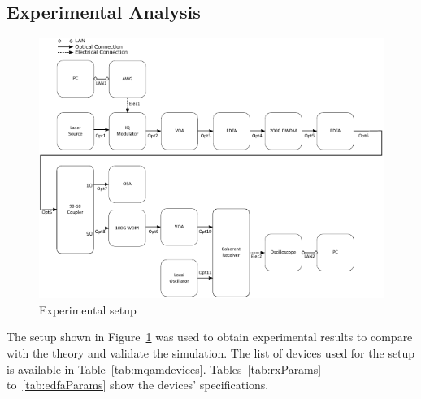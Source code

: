 \begin{refsection}
\subsection{Experimental Analysis}
\begin{figure}[H]
	\centering
	\includegraphics[width=\textwidth]{./sdf/m_qam_system/figures/mqamExperimental20180321.pdf}
	\caption{Experimental setup}
	\label{fig:experimental_mqam_setup}
\end{figure}

The setup shown in Figure~\ref{fig:experimental_mqam_setup} was used to obtain
experimental results to compare with the theory and validate the simulation. The
list of devices used for the setup is available in Table~\ref{tab:mqamdevices}. Tables~\ref{tab:rxParams} to~\ref{tab:edfaParams} show the devices' specifications.



\end{refsection}
